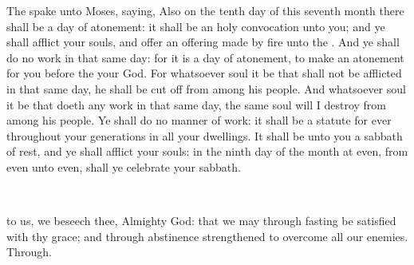 
\vspace{-0.1\baselineskip}

 The  spake unto Moses, saying, Also on the tenth day of this seventh month there shall be a day of atonement: it shall be an holy convocation unto you; and ye shall afflict your souls, and offer an offering made by fire unto the . And ye shall do no work in that same day: for it is a day of atonement, to make an atonement for you before the  your God. For whatsoever soul it be that shall not be afflicted in that same day, he shall be cut off from among his people. And whatsoever soul it be that doeth any work in that same day, the same soul will I destroy from among his people. Ye shall do no manner of work: it shall be a statute for ever throughout your generations in all your dwellings. It shall be unto you a sabbath of rest, and ye shall afflict your souls: in the ninth day of the month at even, from even unto even, shall ye celebrate your sabbath.

\\


\vspace{-0.4\baselineskip}

\collect

\vspace{-0.2\baselineskip}

 to us, we beseech thee, Almighty God: that we may through fasting be satisfied with thy grace; and through abstinence strengthened to overcome all our enemies. Through.

\vspace{-0.4\baselineskip}


\vspace{-0.2\baselineskip}

